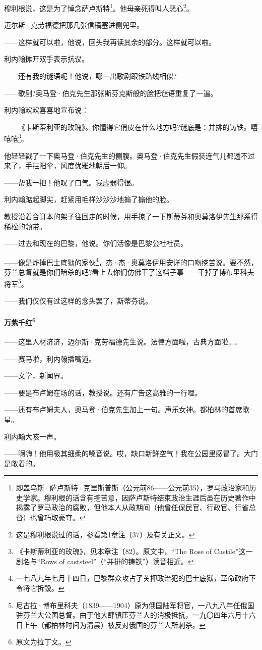 \par 穆利根说，这是为了悼念萨卢斯特\footnote{即盖乌斯·萨卢斯特·克里斯普斯（公元前86——公元前35），罗马政治家和历史学家。穆利根的话含有挖苦意，因萨卢斯特结束政治生涯后虽在历史著作中揭露了罗马政治的腐败，但他本人从政期间（他曾任保民官、行政官、行省总督）也曾巧取豪夺。}。他母亲死得叫人恶心\footnote{这是穆利根说过的话，参看第1章注〔37〕及有关正文。}。
\par 迈尔斯·克劳福德把那几张信稿塞进侧兜里。
\par ——这样就可以啦，他说，回头我再读其余的部分。这样就可以啦。
\par 利内翰摊开双手表示抗议。
\par ——还有我的谜语呢！他说，哪一出歌剧跟铁路线相似?
\par ——歌剧?奥马登·伯克先生那张斯芬克斯般的脸把谜语重复了一遍。
\par 利内翰欢欢喜喜地宣布说：
\par ——《卡斯蒂利亚的玫瑰》。你懂得它俏皮在什么地方吗?谜底是：并排的铸铁。嘻嘻嘻\footnote{《卡斯蒂利亚的玫瑰》，见本章注〔82〕。原文中，“The Rose of Castile”这一剧名与“Rows of caststeel”（“并排的铸铁”）读音相近。}。
\par 他轻轻戳了一下奥马登·伯克先生的侧腹。奥马登·伯克先生假装连气儿都透不过来了，手拄阳伞，风度优雅地朝后一仰。
\par ——帮我一把！他叹了口气。我虚弱得很。
\par 利内翰踮起脚尖，赶紧用毛样沙沙沙地搧了搧他的脸。
\par 教授沿着合订本的架子往回走的时候，用手掠了一下斯蒂芬和奥莫洛伊先生那系得稀松的领带。
\par ——过去和现在的巴黎，他说。你们活像是巴黎公社社员。
\par ——像是炸掉巴士底狱的家伙\footnote{一七八九年七月十四日，巴黎群众攻占了关押政治犯的巴士底狱，革命政府下令将它拆毁。}，杰·杰·奥莫洛伊用安详的口吻挖苦说。要不然，芬兰总督就是你们暗杀的吧?看上去你们仿佛干了这档子事——干掉了博布里科夫将军\footnote{尼古拉·博布里科夫（1839——1904）原为俄国陆军将官，一八九八年任俄国驻芬兰大公国总督。由于他大肆镇压芬兰人的消极抵抗，一九〇四年六月十六日上午（都柏林时间为清晨）被反对俄国的芬兰人所刺杀。}。
\par ——我们仅仅有过这样的念头罢了，斯蒂芬说。
\paragraph*{万紫千红\footnote{原文为拉丁文。}}
\par ——这里人材济济，迈尔斯·克劳福德先生说。法律方面啦，古典方面啦……
\par ——赛马啦，利内翰插嘴道。
\par ——文学，新闻界。
\par ——要是布卢姆在场的话，教授说。还有广告这高雅的一行哩。
\par ——还有布卢姆夫人，奥马登·伯克先生加上一句。声乐女神。都柏林的首席歌星。
\par 利内翰大咳一声。
\par ——啊嗨！他用极其细柔的嗓音说。哎，缺口新鲜空气！我在公园里感冒了。大门是敞着的。
